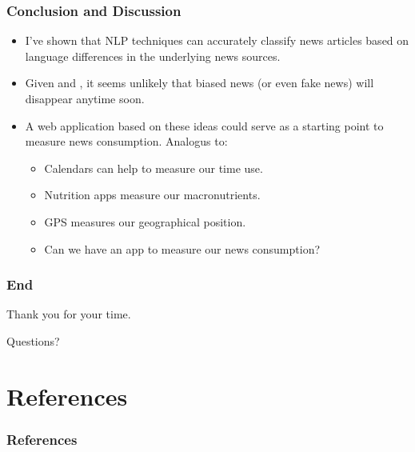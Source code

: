 \documentclass{beamer}
\begin{document}
     \begin{frame}
    	\frametitle{Conclusion and Discussion}
    	\begin{itemize}
    		\item I've shown that NLP techniques can accurately classify news articles based on language differences in the underlying news sources. 
    		\item Given \citet{gentzkow2008competition} and \citet{gentzkow2006media}, it seems unlikely that biased news (or even fake news) will disappear anytime soon. 
    		\item A web application based on these ideas could serve as a starting point to measure news consumption. Analogus to: 
    		\begin{itemize}
    			\item Calendars can help to measure our time use.
    			\item Nutrition apps measure our macronutrients. 
    			\item GPS measures our geographical position.
    			\item Can we have an app to measure our news consumption? 
    		\end{itemize} 
    	\end{itemize}
    \end{frame}

    \begin{frame}
    	\frametitle{End}
    	\centering \Huge Thank you for your time.
    	
    	\centering Questions?
    \end{frame}


\section{References}
	\begingroup
	\tiny
    \begin{frame}
    	\frametitle{References}
    	
    	
    \end{frame}
    \endgroup
\end{document}
